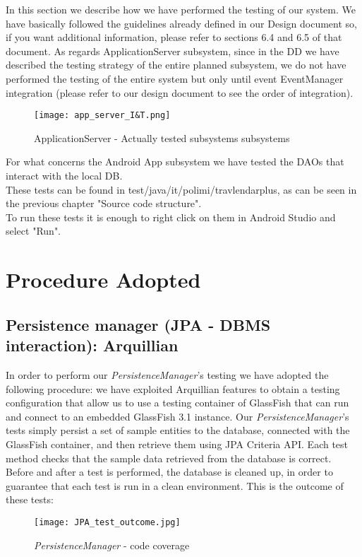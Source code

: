 In this section we describe how we have performed the testing of our system.
We have basically followed the guidelines already defined in our Design document so, if you want additional information, please refer to sections 6.4 and 6.5 of that document.
As regards ApplicationServer subsystem, since in the DD we have described the testing strategy of the entire planned subsystem, we do not have performed the testing of the entire system but only until event EventManager integration (please refer to our design document to see the order of integration).\\
\begin{figure}[H]
	\begin{center}
		\hspace*{-40pt}
		\texttt{[image: app\_server\_I\&T.png]}
	\end{center}
\caption{ ApplicationServer - Actually tested subsystems subsystems}
\end{figure}
For what concerns the Android App subsystem we have tested the DAOs that interact with the local DB. \\
These tests can be found in test/java/it/polimi/travlendarplus, as can be seen in the previous chapter "Source code structure". \\
To run these tests it is enough to right click on them in Android Studio and select "Run".

\section{Procedure Adopted}
\subsection{Persistence manager (JPA - DBMS interaction): Arquillian}
In order to perform our \textit{PersistenceManager}'s testing we have adopted the following procedure: we have exploited Arquillian features to obtain a testing configuration that allow us to use a testing container of GlassFish that can run and connect to an embedded GlassFish 3.1 instance.
Our \textit{PersistenceManager}'s tests simply  persist a set of sample entities to the database, connected with the GlassFish container, and then retrieve them using JPA Criteria API.
Each test method checks that the sample data retrieved from the database is correct. Before and after a test is performed, the database is cleaned up, in order to guarantee that each test is run in a clean environment.
This is the outcome of these tests:
\begin{figure}[H]
	\begin{center}
		\texttt{[image: JPA\_test\_outcome.jpg]}
	\end{center}
\caption{ \textit{PersistenceManager} - code coverage}
\end{figure}

